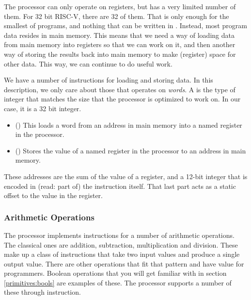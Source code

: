 The processor can only operate on registers, but has a very limited number of them. For 32 bit RISC-V, there are 32 of them. That is only enough for the smallest of programs, and nothing that can be written in \csharp. Instead, most program data resides in main memory. This means that we need a way of loading data from main memory into registers so that we can work on it, and then another way of storing the results back into main memory to make (register) space for other data. This way, we can continue to do useful work.

We have a number of instructions for loading and storing data. In this description, we only care about those that operates on \textsl{words}. A  is the type of integer that matches the size that the processor is optimized to work on. In our case, it is a 32 bit integer.
\begin{itemize}
  \item {} () This loads a word from an address in main memory into a named register in the processor.
  \item {} () Stores the value of a named register in the processor to an address in main memory.
\end{itemize}
These addresses are the sum of the value of a register, and a 12-bit integer that is encoded in (read: part of) the instruction itself. That last part acts as a static offset to the value in the register.

\subsubsection{Arithmetic Operations}

The processor implements instructions for a number of arithmetic operations. The classical ones are addition, subtraction, multiplication and division. These make up a class of instructions that take two input values and produce a single output value. There are other operations that fit that pattern and have value for programmers. Boolean operations that you will get familiar with in section \ref{primitives:bools} are examples of these. The processor supports a number of these through instruction.

